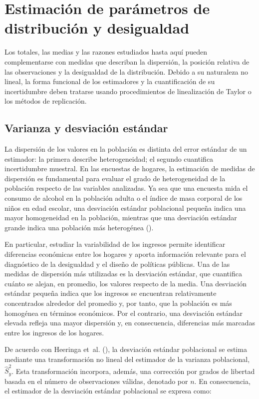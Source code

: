 \documentclass[
  spanish,
  11pt,
  letterpaper,
  oneside,
  open=any]{scrbook}
\begin{document}
\section{Estimación de parámetros de distribución y
desigualdad}\label{estimacion-de-parametros-de-distribucion-y-desigualdad}

Los totales, las medias y las razones estudiados hasta aquí pueden
complementarse con medidas que describan la dispersión, la posición
relativa de las observaciones y la desigualdad de la distribución.
Debido a su naturaleza no lineal, la forma funcional de los estimadores
y la cuantificación de su incertidumbre deben tratarse usando
procedimientos de linealización de Taylor o los métodos de replicación.

\subsection{Varianza y desviación
estándar}\label{estimacion-de-la-dispersion}

La dispersión de los valores en la población es distinta del error
estándar de un estimador: la primera describe heterogeneidad; el segundo
cuantifica incertidumbre muestral. En las encuestas de hogares, la
estimación de medidas de dispersión es fundamental para evaluar el grado
de heterogeneidad de la población respecto de las variables analizadas.
Ya sea que una encuesta mida el consumo de alcohol en la población
adulta o el índice de masa corporal de los niños en edad escolar, una
desviación estándar poblacional pequeña indica una mayor homogeneidad en
la población, mientras que una desviación estándar grande indica una
población más heterogénea ().

En particular, estudiar la variabilidad de los ingresos permite
identificar diferencias económicas entre los hogares y aporta
información relevante para el diagnóstico de la desigualdad y el diseño
de políticas públicas. Una de las medidas de dispersión más utilizadas
es la desviación estándar, que cuantifica cuánto se alejan, en promedio,
los valores respecto de la media. Una desviación estándar pequeña indica
que los ingresos se encuentran relativamente concentrados alrededor del
promedio y, por tanto, que la población es más homogénea en términos
económicos. Por el contrario, una desviación estándar elevada refleja
una mayor dispersión y, en consecuencia, diferencias más marcadas entre
los ingresos de los hogares.

De acuerdo con Heeringa et~al.
(), la desviación estándar
poblacional se estima mediante una transformación no lineal del
estimador de la varianza poblacional, \(\hat{S}_y^2\). Esta
transformación incorpora, además, una corrección por grados de libertad
basada en el número de observaciones válidas, denotado por \(n\). En
consecuencia, el estimador de la desviación estándar poblacional se
expresa como:
\end{document}

